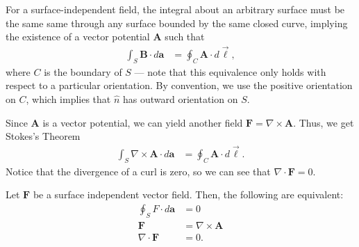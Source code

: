 \documentclass[10pt]{mypackage}
\begin{document}
For a surface-independent field, the integral about an arbitrary surface must be the same same through any surface bounded by the same closed curve, implying the existence of a vector potential $\mathbf{A}$ such that
\begin{align*}
  \int_{S}^{} \mathbf{B}\cdot d\mathbf{a} &= \oint_{C}\mathbf{A}\cdot d\vec{\ell},
\end{align*}
where $C$ is the boundary of $S$ --- note that this equivalence only holds with respect to a particular orientation. By convention, we use the positive orientation on $C$, which implies that $\hat{n}$ has outward orientation on $S$.\newline

Since $\mathbf{A}$ is a vector potential, we can yield another field $\mathbf{F} = \nabla \times \mathbf{A}$. Thus, we get Stokes's Theorem
\begin{align*}
  \int_{S}^{} \nabla \times \mathbf{A}\cdot d\mathbf{a} &= \oint_{C}\mathbf{A}\cdot d\vec{\ell}.
\end{align*}
Notice that the divergence of a curl is zero, so we can see that $\nabla \cdot \mathbf{F} = 0$.
\begin{definition}
  Let $\mathbf{F}$ be a surface independent vector field. Then, the following are equivalent:
  \begin{align*}
    \oint_{S}F\cdot d\mathbf{a} &= 0\\
    \mathbf{F} &= \nabla \times \mathbf{A}\\
    \nabla \cdot \mathbf{F} &= 0.
  \end{align*}
\end{definition}
\end{document}
